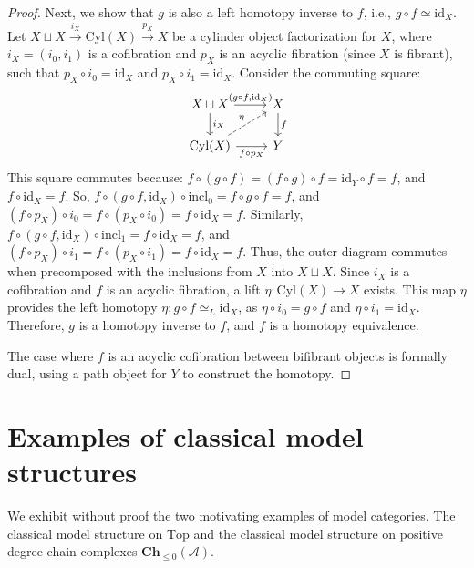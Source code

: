 \documentclass[12pt]{report}
\numberwithin{equation}{section}
\begin{document}
\begin{proof}
		Next, we show that \(g\) is also a left homotopy inverse to \(f\), i.e., \(g \circ f \simeq \text{id}_X\).
		Let \(X \sqcup X \xrightarrow{i_X} \text{Cyl}(X) \xrightarrow{p_X} X\) be a cylinder object factorization for \(X\), where \(i_X = (i_0, i_1)\) is a cofibration and \(p_X\) is an acyclic fibration (since \(X\) is fibrant), such that \(p_X \circ i_0 = \text{id}_X\) and \(p_X \circ i_1 = \text{id}_X\).
		Consider the commuting square:
		\[
		\begin{tikzcd}
			X \sqcup X \arrow{r}{(g \circ f, \text{id}_X)} \arrow[d, "{i_X}"] & X \arrow[d, "{f}"] \\
			\text{Cyl}(X) \arrow{r}[swap]{f \circ p_X} \arrow[ur, dashed, "\eta"] & Y
		\end{tikzcd}
		\]
		This square commutes because:
		\(f \circ (g \circ f) = (f \circ g) \circ f = \text{id}_Y \circ f = f\), and \(f \circ \text{id}_X = f\).
		So, \(f \circ (g \circ f, \text{id}_X) \circ \text{incl}_0 = f \circ g \circ f = f\), and \((f \circ p_X) \circ i_0 = f \circ (p_X \circ i_0) = f \circ \text{id}_X = f\).
		Similarly, \(f \circ (g \circ f, \text{id}_X) \circ \text{incl}_1 = f \circ \text{id}_X = f\), and \((f \circ p_X) \circ i_1 = f \circ (p_X \circ i_1) = f \circ \text{id}_X = f\).
		Thus, the outer diagram commutes when precomposed with the inclusions from \(X\) into \(X \sqcup X\).
		Since \(i_X\) is a cofibration and \(f\) is an acyclic fibration, a lift \(\eta: \text{Cyl}(X) \to X\) exists. This map \(\eta\) provides the left homotopy \(\eta: g \circ f \simeq_L \text{id}_X\), as \(\eta \circ i_0 = g \circ f\) and \(\eta \circ i_1 = \text{id}_X\).
		Therefore, \(g\) is a homotopy inverse to \(f\), and \(f\) is a homotopy equivalence.
		
		The case where \(f\) is an acyclic cofibration between bifibrant objects is formally dual, using a path object for \(Y\) to construct the homotopy.
	\end{proof}
	
	\section{Examples of classical model structures}
	We exhibit without proof the two motivating examples of model categories. The classical model structure on $\mathrm{Top}$ and the classical model structure on positive degree chain complexes $\mathbf{Ch}_{\leq0}(\mathcal{A}).$
	
\end{document}
